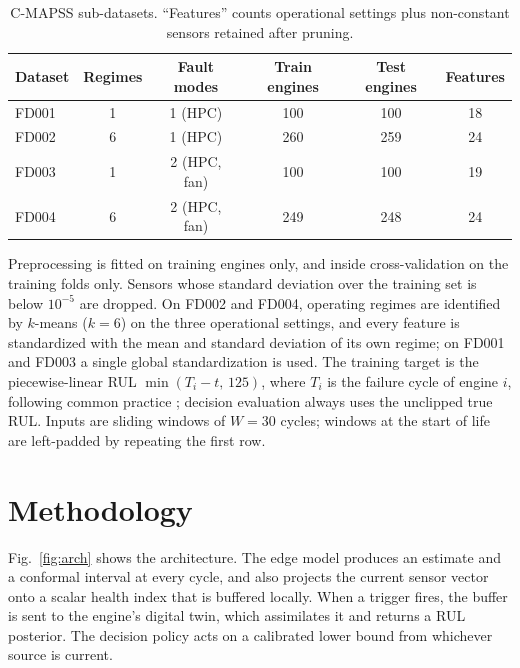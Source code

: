 \documentclass[preprint,12pt,authoryear]{elsarticle}
\newcommand{\botrule}{\bottomrule}
\begin{document}
\begin{table}[t]
\caption{C-MAPSS sub-datasets. ``Features'' counts operational settings plus non-constant sensors retained after pruning.}\label{tab:data}
\begin{tabular*}{\textwidth}{@{\extracolsep\fill}lccccc}
\toprule
Dataset & Regimes & Fault modes & Train engines & Test engines & Features \\
\midrule
FD001 & 1 & 1 (HPC) & 100 & 100 & 18 \\
FD002 & 6 & 1 (HPC) & 260 & 259 & 24 \\
FD003 & 1 & 2 (HPC, fan) & 100 & 100 & 19 \\
FD004 & 6 & 2 (HPC, fan) & 249 & 248 & 24 \\
\botrule
\end{tabular*}
\end{table}

Preprocessing is fitted on training engines only, and inside cross-validation on the training folds only. Sensors whose standard deviation over the training set is below $10^{-5}$ are dropped. On FD002 and FD004, operating regimes are identified by $k$-means ($k=6$) on the three operational settings, and every feature is standardized with the mean and standard deviation of its own regime; on FD001 and FD003 a single global standardization is used. The training target is the piecewise-linear RUL $\min(T_i - t,\,125)$, where $T_i$ is the failure cycle of engine $i$, following common practice \citep{li2018dcnn}; decision evaluation always uses the unclipped true RUL. Inputs are sliding windows of $W = 30$ cycles; windows at the start of life are left-padded by repeating the first row.

\section{Methodology}\label{sec:method}

Fig.~\ref{fig:arch} shows the architecture. The edge model produces an estimate and a conformal interval at every cycle, and also projects the current sensor vector onto a scalar health index that is buffered locally. When a trigger fires, the buffer is sent to the engine's digital twin, which assimilates it and returns a RUL posterior. The decision policy acts on a calibrated lower bound from whichever source is current.
\end{document}
